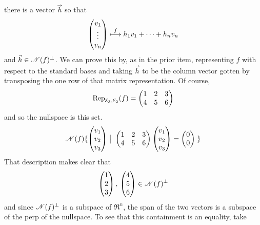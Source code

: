 \begin{exercises}
\begin{answer}
\begin{exparts}
           there is a vector $\vec{h}$ so that
           \begin{equation*}
             \colvec{v_1 \\ \vdots \\ v_n}
             \mapsunder{f}
             h_1v_1+\dots+h_nv_n
           \end{equation*}
           and $\vec{h}\in\nullspace{f}^\perp$.
           We can prove this by, as in the prior item, 
           representing $f$ with
           respect to the standard bases and taking $\vec{h}$ to be the
           column vector gotten by transposing the one row of that 
           matrix representation. 
         \partsitem Of course, 
           \begin{equation*}
             \rep{f}{\stdbasis_3,\stdbasis_2}
             =
             \begin{pmatrix}
               1  &2  &3  \\
               4  &5  &6
             \end{pmatrix}
           \end{equation*}
           and so the nullspace is this set.
           \begin{equation*}
             \nullspace{f}
             \set{\colvec{v_1 \\ v_2 \\ v_3}
                  \suchthat
                   \;\begin{pmatrix}
                     1  &2  &3  \\
                     4  &5  &6
                   \end{pmatrix}
                   \colvec{v_1 \\ v_2 \\ v_3}
                   =\colvec{0  \\ 0}\;}
           \end{equation*}
           That description makes clear that
           \begin{equation*}
             \colvec{1 \\ 2 \\ 3},
              \,\colvec{4 \\ 5 \\ 6}\in\nullspace{f}^\perp
           \end{equation*}
           and since $\nullspace{f}^\perp$ is a subspace of $\Re^n$,
           the span of the two vectors is a subspace of the perp of 
           the nullspace.
           To see that this containment is an equality, take

\end{exparts}
\end{answer}
\end{exercises}
